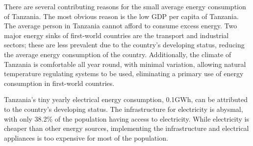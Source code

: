     There are several contributing reasons for the small average energy consumption of Tanzania. The most obvious reason is the low GDP per capita of Tanzania. The average person in Tanzania cannot afford to consume excess energy. Two major energy sinks of first-world countries are the transport and industrial sectors; these are less prevalent due to the country's developing status, reducing the average energy consumption of the country. Additionally, the climate of Tanzania is comfortable all year round, with minimal variation, allowing natural temperature regulating systems to be used, eliminating a primary use of energy consumption in first-world countries. 

    Tanzania's tiny yearly electrical energy consumption, 0.1GWh, can be attributed to the country's developing status. The infrastructure for electricity is abysmal, with only 38.2\% of the population having access to electricity. While electricity is cheaper than other energy sources, implementing the infrastructure and electrical appliances is too expensive for most of the population.








